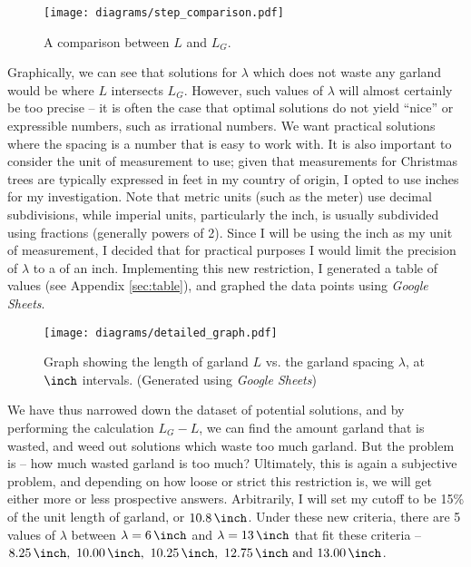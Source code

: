 \begin{figure}[H]
    \centering
    \texttt{[image: diagrams/step\_comparison.pdf]}
    \caption{A comparison between $L$ and $L_G$.} \label{fig:LG}
\end{figure}

Graphically, we can see that solutions for $\lambda$ which does not waste any garland would be where $L$ intersects $L_G$. However, such values of $\lambda$ will almost certainly be too precise -- it is often the case that optimal solutions do not yield ``nice'' or expressible numbers, such as irrational numbers. We want practical solutions where the spacing is a number that is easy to work with. It is also important to consider the unit of measurement to use; given that measurements for Christmas trees are typically expressed in feet in my country of origin, I opted to use inches for my investigation. Note that metric units (such as the meter) use decimal subdivisions, while imperial units, particularly the inch, is usually subdivided using fractions (generally powers of 2). Since I will be using the inch as my unit of measurement, I decided that for practical purposes I would limit the precision of $\lambda$ to a  of an inch. Implementing this new restriction, I generated a table of values (see Appendix \ref{sec:table}), and graphed the data points using \emph{Google Sheets}.

\begin{figure}[H]
    \centering
    \texttt{[image: diagrams/detailed\_graph.pdf]}
    \caption{Graph showing the length of garland $L$ vs. the garland spacing $\lambda$, at  $\unit{\inch}$ intervals. (Generated using \emph{Google Sheets})} \label{fig:detailed}
\end{figure}

We have thus narrowed down the dataset of potential solutions, and by performing the calculation $L_G-L$, we can find the amount garland that is wasted, and weed out solutions which waste too much garland. But the problem is -- how much wasted garland is too much?  Ultimately, this is again a subjective problem, and depending on how loose or strict this restriction is, we will get either more or less prospective answers. Arbitrarily, I will set my cutoff to be 15\% of the unit length of garland, or $\US{10.8}{\inch}$.  Under these new criteria, there are 5 values of $\lambda$ between $\lambda=\US{6}{\inch}$ and $\lambda=\US{13}{\inch}$ that fit these criteria -- $\qtylist{8.25;10.00;10.25;12.75;13.00}{\inch}$.

